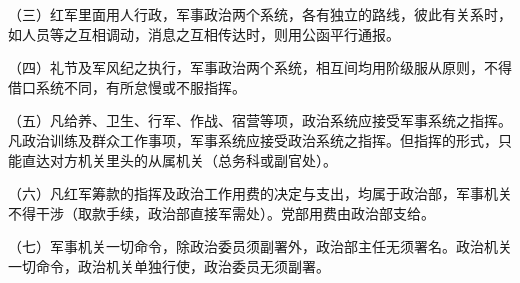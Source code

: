（三）红军里面用人行政，军事政治两个系统，各有独立的路线，彼此有关系时，如人员等之互相调动，消息之互相传达时，则用公函平行通报。

（四）礼节及军风纪之执行，军事政治两个系统，相互间均用阶级服从原则，不得借口系统不同，有所怠慢或不服指挥。

（五）凡给养、卫生、行军、作战、宿营等项，政治系统应接受军事系统之指挥。凡政治训练及群众工作事项，军事系统应接受政治系统之指挥。但指挥的形式，只能直达对方机关里头的从属机关（总务科或副官处）。

（六）凡红军筹款的指挥及政治工作用费的决定与支出，均属于政治部，军事机关不得干涉（取款手续，政治部直接军需处）。党部用费由政治部支给。

（七）军事机关一切命令，除政治委员须副署外，政治部主任无须署名。政治机关一切命令，政治机关单独行使，政治委员无须副署。
